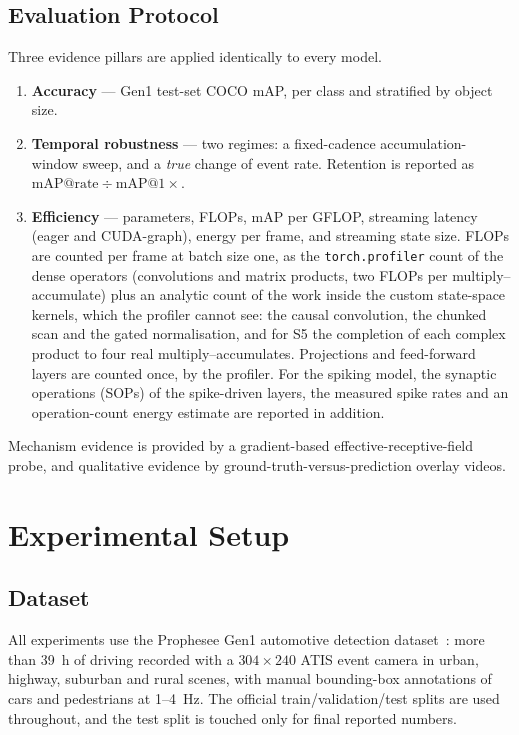 \documentclass[11pt, a4paper]{report}
\begin{document}
\section{Evaluation Protocol}
\label{sec:eval_protocol}
Three evidence pillars are applied identically to every model.
\begin{enumerate}
  \item \textbf{Accuracy} --- Gen1 test-set COCO mAP, per class and stratified by object size.
  \item \textbf{Temporal robustness} --- two regimes: a fixed-cadence accumulation-window sweep, and a
        \emph{true} change of event rate. Retention is reported as $\mathrm{mAP}@\text{rate} \div \mathrm{mAP}@1\times$.
  \item \textbf{Efficiency} --- parameters, FLOPs, mAP per GFLOP, streaming latency (eager and
        CUDA-graph), energy per frame, and streaming state size. FLOPs are counted per frame at batch
        size one, as the \texttt{torch.profiler} count of the dense operators (convolutions and matrix
        products, two FLOPs per multiply--accumulate) plus an analytic count of the work inside the
        custom state-space kernels, which the profiler cannot see: the causal convolution, the chunked
        scan and the gated normalisation, and for S5 the completion of each complex product to four real
        multiply--accumulates. Projections and feed-forward layers are counted once, by the profiler.
        For the spiking model, the synaptic operations (SOPs) of the spike-driven layers, the measured
        spike rates and an operation-count energy estimate are reported in addition.
\end{enumerate}
Mechanism evidence is provided by a gradient-based effective-receptive-field probe, and qualitative
evidence by ground-truth-versus-prediction overlay videos.


\chapter{Experimental Setup}
\label{ch:setup}

\section{Dataset}
\label{sec:dataset}
All experiments use the Prophesee Gen1 automotive detection dataset~\cite{detournemire2020large}:
more than 39~h of driving recorded with a $304 \times 240$ ATIS event camera in urban, highway,
suburban and rural scenes, with manual bounding-box annotations of cars and pedestrians at 1--4~Hz.
The official train/validation/test splits are used throughout, and the test split is touched only for
final reported numbers.
\end{document}
